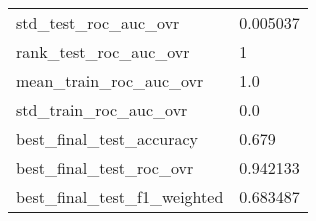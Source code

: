 \begin{tabular}{ll}
std\_test\_roc\_auc\_ovr        &                                           0.005037 \\
rank\_test\_roc\_auc\_ovr       &                                                  1 \\
mean\_train\_roc\_auc\_ovr      &                                                1.0 \\
std\_train\_roc\_auc\_ovr       &                                                0.0 \\
best\_final\_test\_accuracy    &                                              0.679 \\
best\_final\_test\_roc\_ovr     &                                           0.942133 \\
best\_final\_test\_f1\_weighted &                                           0.683487 \\
\bottomrule
\end{tabular}
